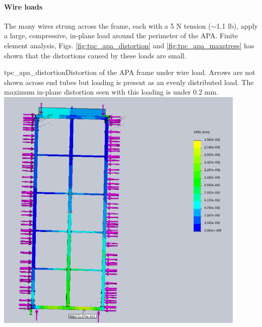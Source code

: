 \paragraph{Wire loads}

The many wires strung across the frame, each with a 5 N tension ($\sim$1.1 lb), apply a large, compressive, in-plane load around the perimeter of the APA.  Finite element analysis, Figs. \ref{fig:tpc_apa_distortion} and \ref{fig:tpc_apa_maxstress} has shown that the distortions caused by these loads are small.

\begin{cdrfigure}{tpc_apa_distortion}{Distortion of the APA frame under wire load.  Arrows are not shown across end tubes but loading is present as an evenly distributed load.  The maximum in-plane distortion seen with this loading is under 0.2 mm.}
\includegraphics[width=0.9\textwidth]{figures/tpc_apa_distortion.png} 
\end{cdrfigure}

